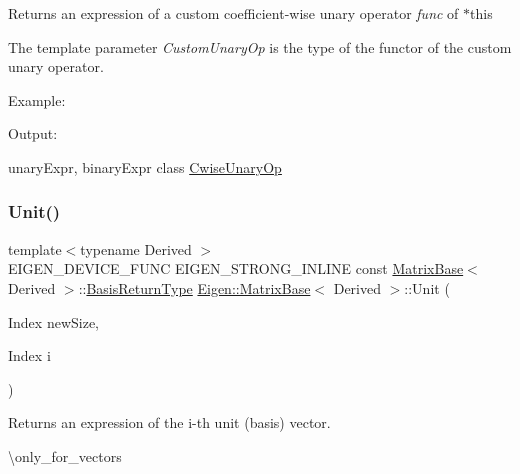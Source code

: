 \begin{DoxyReturn}{Returns}
an expression of a custom coefficient-\/wise unary operator {\itshape func} of $\ast$this
\end{DoxyReturn}
The template parameter {\itshape Custom\+Unary\+Op} is the type of the functor of the custom unary operator.

Example\+: 
\begin{DoxyCodeInclude}{0}
\end{DoxyCodeInclude}
 Output\+: 
\begin{DoxyVerbInclude}
\end{DoxyVerbInclude}
 unary\+Expr, binary\+Expr class \mbox{\hyperlink{class_eigen_1_1_cwise_unary_op}{Cwise\+Unary\+Op}} \mbox{\label{class_eigen_1_1_matrix_base_a1f39dde25807c1f008aa874e690b3fed}} 
\subsubsection{\texorpdfstring{Unit()}{Unit()}\hspace{0.1cm}{\footnotesize\ttfamily [1/2]}}
{\footnotesize\ttfamily template$<$typename Derived $>$ \\
E\+I\+G\+E\+N\+\_\+\+D\+E\+V\+I\+C\+E\+\_\+\+F\+U\+NC E\+I\+G\+E\+N\+\_\+\+S\+T\+R\+O\+N\+G\+\_\+\+I\+N\+L\+I\+NE const \mbox{\hyperlink{class_eigen_1_1_matrix_base}{Matrix\+Base}}$<$ Derived $>$\+::\mbox{\hyperlink{class_eigen_1_1_block}{Basis\+Return\+Type}} \mbox{\hyperlink{class_eigen_1_1_matrix_base}{Eigen\+::\+Matrix\+Base}}$<$ Derived $>$\+::Unit (\begin{DoxyParamCaption}\item[{Index}]{new\+Size,  }\item[{Index}]{i }\end{DoxyParamCaption})\hspace{0.3cm}{\ttfamily [static]}}

\begin{DoxyReturn}{Returns}
an expression of the i-\/th unit (basis) vector.
\end{DoxyReturn}
\textbackslash{}only\+\_\+for\+\_\+vectors

